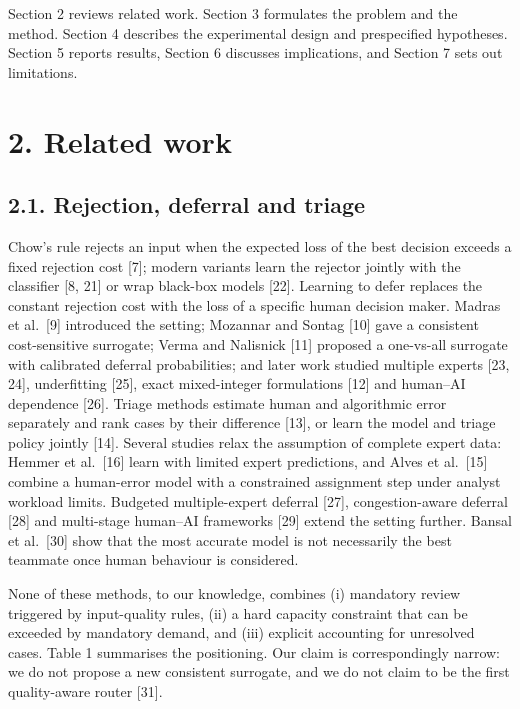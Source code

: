 \documentclass[
  11pt,
]{article}
\begin{document}
Section 2 reviews related work. Section 3 formulates the problem and the
method. Section 4 describes the experimental design and prespecified
hypotheses. Section 5 reports results, Section 6 discusses implications,
and Section 7 sets out limitations.

\hypertarget{related-work}{%
\section{2. Related work}\label{related-work}}

\hypertarget{rejection-deferral-and-triage}{%
\subsection{2.1. Rejection, deferral and
triage}\label{rejection-deferral-and-triage}}

Chow's rule rejects an input when the expected loss of the best decision
exceeds a fixed rejection cost {[}7{]}; modern variants learn the
rejector jointly with the classifier {[}8, 21{]} or wrap black-box
models {[}22{]}. Learning to defer replaces the constant rejection cost
with the loss of a specific human decision maker. Madras et al.~{[}9{]}
introduced the setting; Mozannar and Sontag {[}10{]} gave a consistent
cost-sensitive surrogate; Verma and Nalisnick {[}11{]} proposed a
one-vs-all surrogate with calibrated deferral probabilities; and later
work studied multiple experts {[}23, 24{]}, underfitting {[}25{]}, exact
mixed-integer formulations {[}12{]} and human--AI dependence {[}26{]}.
Triage methods estimate human and algorithmic error separately and rank
cases by their difference {[}13{]}, or learn the model and triage policy
jointly {[}14{]}. Several studies relax the assumption of complete
expert data: Hemmer et al.~{[}16{]} learn with limited expert
predictions, and Alves et al.~{[}15{]} combine a human-error model with
a constrained assignment step under analyst workload limits. Budgeted
multiple-expert deferral {[}27{]}, congestion-aware deferral {[}28{]}
and multi-stage human--AI frameworks {[}29{]} extend the setting
further. Bansal et al.~{[}30{]} show that the most accurate model is not
necessarily the best teammate once human behaviour is considered.

None of these methods, to our knowledge, combines (i) mandatory review
triggered by input-quality rules, (ii) a hard capacity constraint that
can be exceeded by mandatory demand, and (iii) explicit accounting for
unresolved cases. Table 1 summarises the positioning. Our claim is
correspondingly narrow: we do not propose a new consistent surrogate,
and we do not claim to be the first quality-aware router {[}31{]}.
\end{document}

